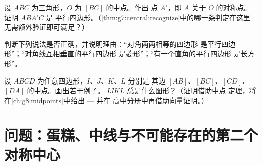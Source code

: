 \begin{exercise}[$\star\star$]\label{exo:g7:central:9}
设 $ABC$ 为三角形，$O$ 为 $[BC]$ 的中点。作出
点 $A'$，即 $A$ 关于 $O$ 的对称点。证明 $ABA'C$ 是
平行四边形。（\cref{thm:g7:central:recognize}中的哪一条判定在这里
无需额外验证即可满足？）
\end{exercise}

\begin{exercise}[$\star\star$]\label{exo:g7:central:10}
判断下列说法是否正确，并说明理由：“对角两两相等的四边形
是平行四边形”；“对角线互相垂直的平行四边形
是菱形”；“有一个直角的平行四边形
是长方形”。
\end{exercise}

\begin{exercise}[$\star\star\star$]\label{exo:g7:central:11}
设 $ABCD$ 为任意四边形，$I$、$J$、$K$、$L$ 分别是
其边 $[AB]$、$[BC]$、$[CD]$、$[DA]$ 的中点。画出若干例子。
$IJKL$ 总是什么图形？（证明借助中点
定理，将在\cref{ch:g8:midpoints}中给出 --- 并在
高中分册中再借助向量证明。）
\end{exercise}

\section{问题：蛋糕、中线与不可能存在的第二个
对称中心}

